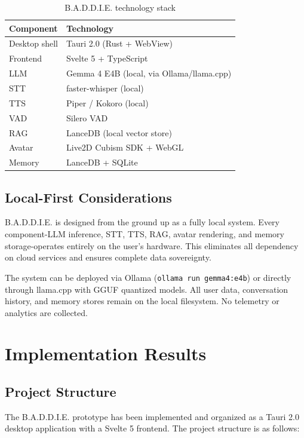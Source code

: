 \documentclass[sigconf]{acmart}
\begin{document}
\begin{table}[htbp]
    \centering
    \caption{B.A.D.D.I.E. technology stack}
    \label{tab:stack}
    \begin{tabular}{@{}ll@{}}
        \toprule
        \textbf{Component} & \textbf{Technology} \\
        \midrule
        Desktop shell & Tauri 2.0 (Rust + WebView) \\
        Frontend & Svelte 5 + TypeScript \\
        LLM & Gemma 4 E4B (local, via Ollama/llama.cpp) \\
        STT & faster-whisper (local) \\
        TTS & Piper / Kokoro (local) \\
        VAD & Silero VAD \\
        RAG & LanceDB (local vector store) \\
        Avatar & Live2D Cubism SDK + WebGL \\
        Memory & LanceDB + SQLite \\
        \bottomrule
    \end{tabular}
\end{table}

\subsection{Local-First Considerations}

B.A.D.D.I.E. is designed from the ground up as a fully local system. Every component-LLM inference, STT, TTS, RAG, avatar rendering, and memory storage-operates entirely on the user's hardware. This eliminates all dependency on cloud services and ensures complete data sovereignty.

The system can be deployed via Ollama (\texttt{ollama run gemma4:e4b}) or directly through llama.cpp with GGUF quantized models. All user data, conversation history, and memory stores remain on the local filesystem. No telemetry or analytics are collected.

\section{Implementation Results}

\subsection{Project Structure}

The B.A.D.D.I.E. prototype has been implemented and organized as a Tauri 2.0 desktop application with a Svelte 5 frontend. The project structure is as follows:
\end{document}
